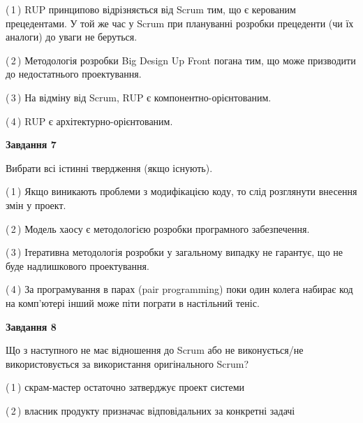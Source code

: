 \documentclass[10pt, ukrainian]{article}
\begin{document}
{\begin {large}
(\,1\,) RUP принципово відрізняється від Scrum тим, що є керованим прецедентами. У той же час у Scrum при плануванні розробки прецеденти (чи їх аналоги) до уваги не беруться. %



(\,2\,) Методологія розробки Big Design Up Front погана тим, що може призводити до недостатнього проектування.%



(\,3\,) На відміну від Scrum, RUP є компонентно-орієнтованим. %



(\,4\,) RUP є архітектурно-орієнтованим. %


{\begin {center}\textbf{Завдання 7}\end {center}}\par
Вибрати всі істинні твердження (якщо існують).\par
\vspace{2mm}



(\,1\,) Якщо виникають проблеми з модифікацією коду, то слід розглянути внесення змін у проект. %



(\,2\,) Модель хаосу є методологією розробки програмного забезпечення. %



(\,3\,) Ітеративна методологія розробки у загальному випадку не гарантує, що не буде надлишкового проектування. %



(\,4\,) За програмування в парах (pair programming) поки один колега набирає код на комп'ютері інший може піти пограти в настільний теніс. %


{\begin {center}\textbf{Завдання 8}\end {center}}\par
Що з наступного не має відношення до Scrum або не виконується/не використовується за використання оригінального Scrum?\par
\vspace{2mm}



(\,1\,) скрам-мастер остаточно затверджує проект системи%



(\,2\,) власник продукту призначає відповідальних за конкретні задачі%




\end{large}}
\end{document}
